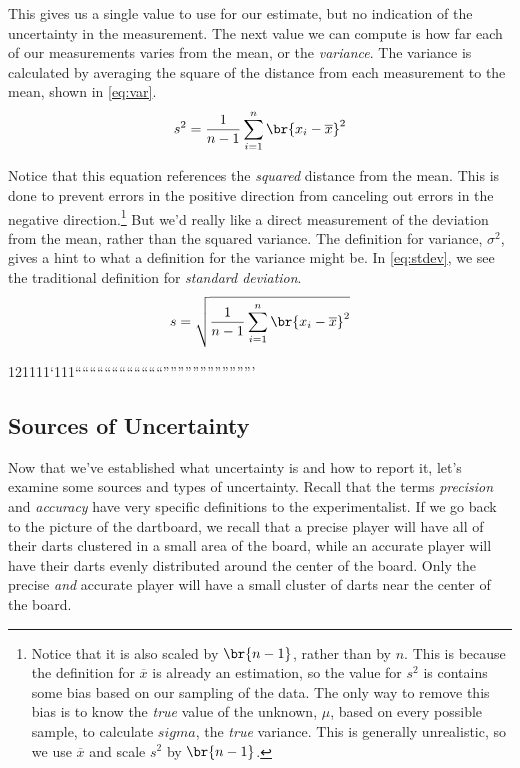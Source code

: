 \documentclass[nobib,nofonts,nols,nohyper]{tufte-handout}
\begin{document}
This gives us a single value to use for our estimate, but no indication of the uncertainty in the measurement. 
The next value we can compute is how far each of our measurements varies from the mean, or the \emph{variance}. 
The variance is calculated by averaging the square of the distance from each measurement to the mean, shown in \cref{eq:var}. 
\begin{equation}
	s^2 = \frac{1}{n-1}\sum_{i=1}^{n}{\br{x_i - \overline{x}}^2}
	\label{eq:var}
\end{equation}

Notice that this equation references the \emph{squared} distance from the mean. 
This is done to prevent errors in the positive direction from canceling out errors in the negative direction.\footnote{Notice that it is also scaled by \( \br{n-1} \), rather than by \( n \). This is because the definition for \( \overline{x} \) is already an estimation, so the value for \( s^2 \) is contains some bias based on our sampling of the data. The only way to remove this bias is to know the \emph{true} value of the unknown, \( \mu \), based on every possible sample, to calculate \( sigma \), the \emph{true} variance. This is generally unrealistic, so we use \( \overline{x} \) and scale \( s^2 \) by \( \br{n-1} \).}
But we'd really like a direct measurement of the deviation from the mean, rather than the squared variance. 
The definition for variance, \( \sigma^2 \), gives a hint to what a definition for the variance might be. 
In \cref{eq:stdev}, we see the traditional definition for \emph{standard deviation}. 
\begin{equation}
	s = \sqrt{\frac{1}{n-1}\sum_{i=1}^{n}{\br{x_i - \overline{x}}^2}}
	\label{eq:stdev}
\end{equation}

121111`111````````````````````````'''''''''''''''''''''''''

\subsection{Sources of Uncertainty} %
\label{sub:sources_of_uncertainty}

Now that we've established what uncertainty is and how to report it, let's examine some sources and types of uncertainty. 
Recall that the terms \emph{precision} and \emph{accuracy} have very specific definitions to the experimentalist. 
If we go back to the picture of the dartboard, we recall that a precise player will have all of their darts clustered in a small area of the board, while an accurate player will have their darts evenly distributed around the center of the board. 
Only the precise \emph{and} accurate player will have a small cluster of darts near the center of the board. 
\end{document}
